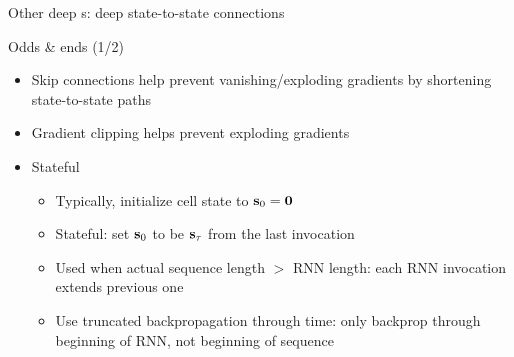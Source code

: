 \begin{frame}{Other deep \rnn{}s: deep state-to-state connections \citep{PascanuICLR14}}
    
    
\end{frame}

\begin{frame}{Odds \& ends (1/2)}
    \begin{itemize}
        \item<+-> Skip connections help prevent vanishing/exploding gradients by shortening state-to-state paths
        \item<+-> Gradient clipping helps prevent exploding gradients \citep{MikolovPhD12,PascanuICML13}
        \item<+-> Stateful \rnn{}
        \begin{itemize}[<.->]
            \item Typically, initialize cell state to $\mathbf{s}_0 = \mathbf{0}$
            \item<+-> Stateful: set $\mathbf{s}_0$ to be $\mathbf{s}_\tau$ from the last \rnn{} invocation
            \item Used when actual sequence length $>$ RNN length: each RNN invocation extends previous one
            \item Use truncated backpropagation through time: only backprop through beginning of RNN, not beginning of sequence
        \end{itemize}
    \end{itemize}

    \centering
    
\end{frame}

